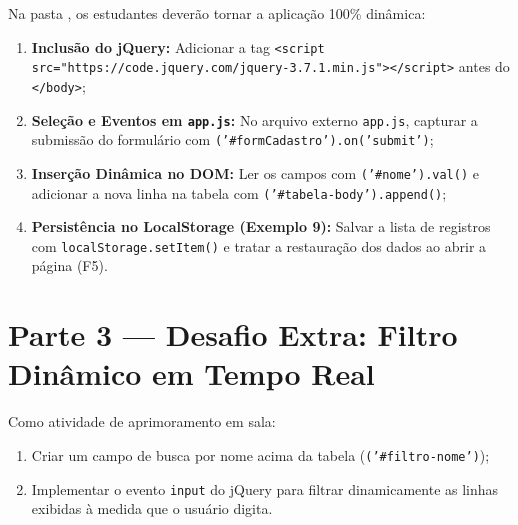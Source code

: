 \begin{boxAtividade}

Na pasta , os estudantes deverão tornar a aplicação 100\% dinâmica:

\begin{enumerate}
\item \textbf{Inclusão do jQuery:} Adicionar a tag \texttt{<script src="https://code.\allowbreak{}jquery.\allowbreak{}com/\allowbreak{}jquery-3.\allowbreak{}7.\allowbreak{}1.\allowbreak{}min.\allowbreak{}js"></script>} antes do \texttt{</body>};
\item \textbf{Seleção e Eventos em \texttt{app.js}:} No arquivo externo \texttt{app.js}, capturar a submissão do formulário com \texttt{\textdollar('\#formCadastro')\allowbreak{}.\allowbreak{}on('submit')};
\item \textbf{Inserção Dinâmica no DOM:} Ler os campos com \texttt{\textdollar('\#nome').val()} e adicionar a nova linha na tabela com \texttt{\textdollar('\#tabela-body').append()};
\item \textbf{Persistência no LocalStorage (Exemplo 9):} Salvar a lista de registros com \texttt{localStorage.setItem()} e tratar a restauração dos dados ao abrir a página (F5).
\end{enumerate}

\end{boxAtividade}


\section{Parte 3 — Desafio Extra: Filtro Dinâmico em Tempo Real}\label{sec:m4a}

\begin{boxAtividade}

Como atividade de aprimoramento em sala:

\begin{enumerate}
\item Criar um campo de busca por nome acima da tabela (\texttt{\textdollar('\#filtro-nome')});
\item Implementar o evento \texttt{input} do jQuery para filtrar dinamicamente as linhas exibidas à medida que o usuário digita.
\end{enumerate}

\end{boxAtividade}

